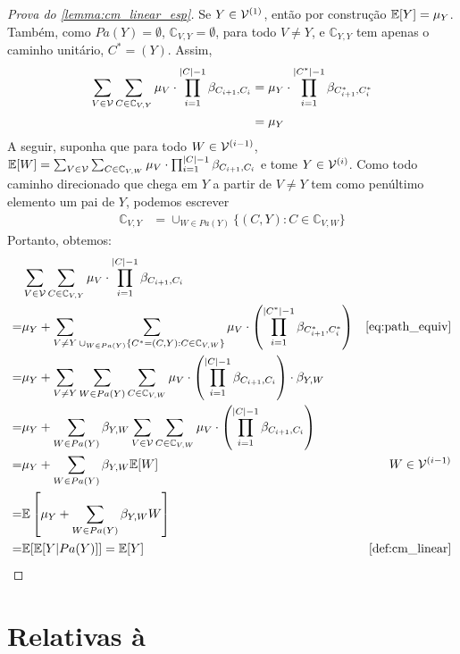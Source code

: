 \begin{proof}[Prova do \cref{lemma:cm_linear_esp}]
 Se $Y \in {\mathcal V}^{(1)}$, então por construção
 ${\mathbb E}[Y] = \mu_Y$. Também, como $Pa(Y) = \emptyset$,
 $\mathbb{C}_{V,Y} = \emptyset$, para todo $V \neq Y$, e
 $\mathbb{C}_{Y,Y}$ tem apenas o caminho unitário, $C^* = (Y)$.
 Assim,
 \begin{align*}
  \sum_{V \in \mathbb{{\mathcal V}}} 
  \sum_{C \in \mathbb{C}_{V,Y}}
  \mu_V \cdot \prod_{i=1}^{|C|-1} \beta_{C_{i+1},C_i} 
  &= \mu_Y \cdot \prod_{i=1}^{|C^*|-1} \beta_{C^*_{i+1},C^*_i} \\
  &= \mu_Y
 \end{align*}
 A seguir, suponha que para todo
 $W \in {\mathcal V}^{(i-1)}$,
 ${\mathbb E}[W] = \sum_{V \in \mathbb{{\mathcal V}}}\sum_{C \in \mathbb{C}_{V,W}} \mu_V \cdot 
 \prod_{i=1}^{|C|-1} \beta_{C_{i+1},C_i}$ e
 tome $Y \in {\mathcal V}^{(i)}$. Como todo caminho direcionado que 
 chega em $Y$ a partir de $V \neq Y$
 tem como penúltimo elemento um pai de $Y$,
 podemos escrever
 \begin{align}
  \label{eq:path_equiv}
  \mathbb{C}_{V,Y} 
  &= \cup_{W \in Pa(Y)} \{(C,Y): C \in \mathbb{C}_{V,W}\}
 \end{align}
 Portanto, obtemos:
 \begin{align*}
  &\sum_{V \in \mathbb{\sV}}\sum_{C \in \mathbb{C}_{V,Y}} \mu_V \cdot 
  \prod_{i=1}^{|C|-1} \beta_{C_{i+1},C_i} \\
  =& \mu_Y 
  + \sum_{V \neq Y} \sum_{\cup_{W \in Pa(Y)} \{C^* = (C,Y): C \in \mathbb{C}_{V,W}\}} 
  \mu_V \cdot \left(\prod_{i=1}^{|C^*|-1} \beta_{C^*_{i+1},C^*_i}\right) 
  & \text{\cref{eq:path_equiv}} \\
  =& \mu_Y + \sum_{V \neq Y} \sum_{W \in Pa(Y)} \sum_{C \in \mathbb{C}_{V,W}}
  \mu_V \cdot \left(\prod_{i=1}^{|C|-1} \beta_{C_{i+1},C_i}\right) \cdot \beta_{Y, W} \\
  =& \mu_Y + \sum_{W \in Pa(Y)} \beta_{Y, W} 
  \sum_{V \in \sV} \sum_{C \in \mathbb{C}_{V,W}}
  \mu_V \cdot \left(\prod_{i=1}^{|C|-1} \beta_{C_{i+1},C_i}\right) \\
  =& \mu_Y + \sum_{W \in Pa(Y)} \beta_{Y,W} \E[W]
  & W \in \sV^{(i-1)} \\
  =& \E\left[\mu_Y + \sum_{W \in Pa(Y)} \beta_{Y,W} W\right] \\
  =& \E[\E[Y|Pa(Y)]] = \E[Y]
  & \text{\cref{def:cm_linear}}
 \end{align*}
\end{proof}

\section{Relativas à }


